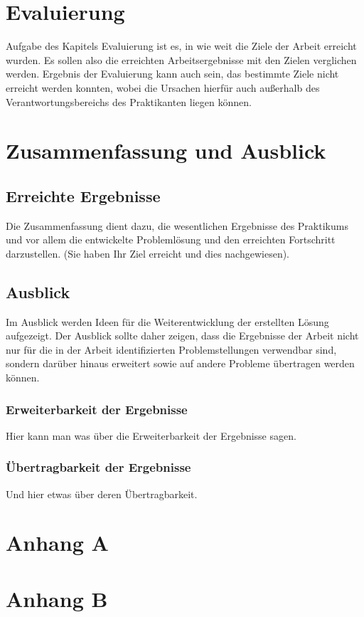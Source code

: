 \documentclass[oneside]{ausarbeitung}
\begin{document}
\chapter{Evaluierung}

Aufgabe des Kapitels Evaluierung ist es, in wie weit die Ziele der 
Arbeit erreicht wurden. Es sollen also die erreichten Arbeitsergebnisse 
mit den Zielen verglichen werden. Ergebnis der Evaluierung kann auch 
sein, das bestimmte Ziele nicht erreicht werden konnten, wobei die 
Ursachen hierfür auch außerhalb des Verantwortungsbereichs des 
Praktikanten liegen können.

\chapter{Zusammenfassung und Ausblick}
\label{cha:zusammenfassung}

\section{Erreichte Ergebnisse}
\label{sec:ergebnisse}

Die Zusammenfassung dient dazu, die wesentlichen Ergebnisse des 
Praktikums und vor allem die entwickelte Problemlösung und den 
erreichten Fortschritt darzustellen. (Sie haben Ihr Ziel erreicht und 
dies nachgewiesen).

\section{Ausblick}
\label{sec:ausblick}

Im Ausblick werden Ideen für die Weiterentwicklung der erstellten Lösung 
aufgezeigt. Der Ausblick sollte daher zeigen, dass die Ergebnisse der 
Arbeit nicht nur für die in der Arbeit identifizierten Problemstellungen 
verwendbar sind, sondern darüber hinaus erweitert sowie auf andere 
Probleme übertragen werden können.

\subsection{Erweiterbarkeit der Ergebnisse}
\label{sub:erweiterbarkeit}

Hier kann man was über die Erweiterbarkeit der Ergebnisse sagen.

\subsection{Übertragbarkeit der Ergebnisse}
\label{sub:uebertragbarkeit}

Und hier etwas über deren Übertragbarkeit.

\appendix

\printbibliography[heading=bibintoc]

\chapter{Anhang A}

\chapter{Anhang B}
\end{document}
